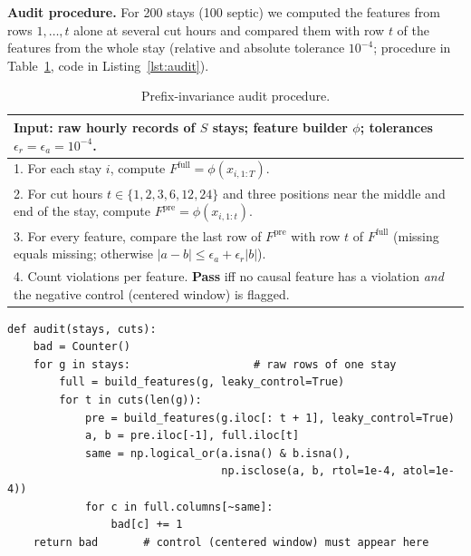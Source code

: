 \documentclass[preprint,12pt]{elsarticle}
\begin{document}


\textbf{Audit procedure.} For 200 stays (100 septic) we computed the features from rows $1,\dots,t$ alone at several cut hours and compared them with row $t$ of the features from the whole stay (relative and absolute tolerance $10^{-4}$; procedure in Table~\ref{tab:alg}, code in Listing~\ref{lst:audit}).

\begin{table}[!t]
\centering\footnotesize
\caption{Prefix-invariance audit procedure.}
\label{tab:alg}
\begin{tabular}{p{}}
\toprule
\textbf{Input:} raw hourly records of $S$ stays; feature builder $\phi$; tolerances $\epsilon_r=\epsilon_a=10^{-4}$.\\
\midrule
1. For each stay $i$, compute $F^{\mathrm{full}}=\phi(x_{i,1:T})$.\\
2. For cut hours $t\in\{1,2,3,6,12,24\}$ and three positions near the middle and end of the stay, compute $F^{\mathrm{pre}}=\phi(x_{i,1:t})$.\\
3. For every feature, compare the last row of $F^{\mathrm{pre}}$ with row $t$ of $F^{\mathrm{full}}$ (missing equals missing; otherwise $|a-b|\le\epsilon_a+\epsilon_r|b|$).\\
4. Count violations per feature. \textbf{Pass} iff no causal feature has a violation \emph{and} the negative control (centered window) is flagged.\\
\bottomrule
\end{tabular}
\end{table}

\begin{lstlisting}[float=!t,caption={Prefix-invariance audit. A pass requires no violation for any causal feature and a flagged negative control.},label={lst:audit}]
def audit(stays, cuts):
    bad = Counter()
    for g in stays:                   # raw rows of one stay
        full = build_features(g, leaky_control=True)
        for t in cuts(len(g)):
            pre = build_features(g.iloc[: t + 1], leaky_control=True)
            a, b = pre.iloc[-1], full.iloc[t]
            same = np.logical_or(a.isna() & b.isna(),
                                 np.isclose(a, b, rtol=1e-4, atol=1e-4))
            for c in full.columns[~same]:
                bad[c] += 1
    return bad       # control (centered window) must appear here
\end{lstlisting}
\end{document}
